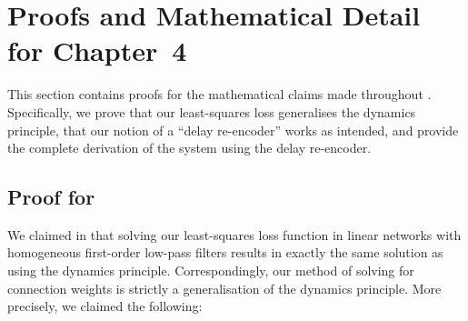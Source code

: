 
\section{Proofs and Mathematical Detail for Chapter~4}
\label{app:temporal_tuning_proofs}

This section contains proofs for the mathematical claims made throughout .
Specifically, we prove that our least-squares loss generalises the \NEF dynamics principle, that our notion of a \enquote{delay re-encoder} works as intended, and provide the complete derivation of the \LDN system using the delay re-encoder.

\subsection{Proof for }
\label{app:lstsq_nef_equivalence}

We claimed in  that solving our least-squares loss function in linear networks with homogeneous first-order low-pass filters results in exactly the same solution as using the \NEF dynamics principle.
Correspondingly, our method of solving for connection weights is strictly a generalisation of the dynamics principle.
More precisely, we claimed the following:

\thmTemporalLstsq*

